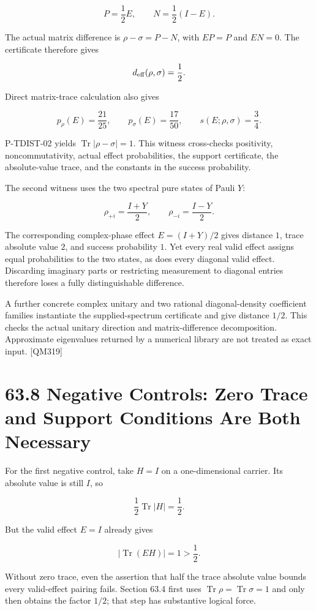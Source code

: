 \documentclass[
  11pt,
  oneside]{book}
\begin{document}
\[
P=\frac12E,\qquad N=\frac12(I-E).
\]

The actual matrix difference is \(\rho-\sigma=P-N\), with \(EP=P\) and
\(EN=0\). The certificate therefore gives

\[
d_{\rm eff}(\rho,\sigma)=\frac12.
\]

Direct matrix-trace calculation also gives

\[
p_\rho(E)=\frac{21}{25},
\qquad
p_\sigma(E)=\frac{17}{50},
\qquad
s(E;\rho,\sigma)=\frac34.
\]

P-TDIST-02 yields \(\operatorname{Tr}|\rho-\sigma|=1\). This witness
cross-checks positivity, noncommutativity, actual effect probabilities,
the support certificate, the absolute-value trace, and the constants in
the success probability.

The second witness uses the two spectral pure states of Pauli \(Y\):

\[
\rho_{+i}=\frac{I+Y}{2},
\qquad
\rho_{-i}=\frac{I-Y}{2}.
\]

The corresponding complex-phase effect \(E=(I+Y)/2\) gives distance
\(1\), trace absolute value \(2\), and success probability \(1\). Yet
every real valid effect assigns equal probabilities to the two states,
as does every diagonal valid effect. Discarding imaginary parts or
restricting measurement to diagonal entries therefore loses a fully
distinguishable difference.

A further concrete complex unitary and two rational diagonal-density
coefficient families instantiate the supplied-spectrum certificate and
give distance \(1/2\). This checks the actual unitary direction and
matrix-difference decomposition. Approximate eigenvalues returned by a
numerical library are not treated as exact input. {[}QM319{]}

\section{63.8 Negative Controls: Zero Trace and Support Conditions Are
Both Necessary}

For the first negative control, take \(H=I\) on a one-dimensional
carrier. Its absolute value is still \(I\), so

\[
\frac12\operatorname{Tr}|H|=\frac12.
\]

But the valid effect \(E=I\) already gives

\[
|\operatorname{Tr}(EH)|=1>\frac12.
\]

Without zero trace, even the assertion that half the trace absolute
value bounds every valid-effect pairing fails. Section 63.4 first uses
\(\operatorname{Tr}\rho=\operatorname{Tr}\sigma=1\) and only then
obtains the factor \(1/2\); that step has substantive logical force.
\end{document}

